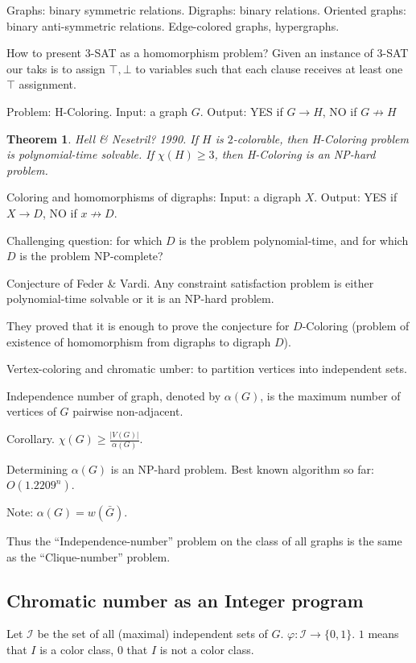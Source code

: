 \documentclass[12pt,a4paper]{article}
\newtheorem{theorem}{Theorem}
\begin{document}
Graphs: binary symmetric relations.
Digraphs: binary relations.
Oriented graphs: binary anti-symmetric relations.
Edge-colored graphs, hypergraphs.

How to present \(3\)-SAT as a homomorphism problem?  Given an instance of
\(3\)-SAT our taks is to assign \(\top, \bot\) to variables such that each
clause receives at least one \(\top\) assignment.

Problem: H-Coloring.
Input: a graph \(G\).
Output: YES if \(G \to H\), NO if \(G \not\to H\)

\begin{theorem}
  Hell \& Nesetril? 1990.  If \(H\) is \(2\)-colorable, then H-Coloring problem
  is polynomial-time solvable.  If \(\chi(H) \geq 3\), then H-Coloring is an
  NP-hard problem.
\end{theorem}

Coloring and homomorphisms of digraphs:
Input: a digraph \(X\).
Output: YES if \(X \to D\), NO if \(x \not\to D\).

Challenging question: for which \(D\) is the problem polynomial-time, and for
which \(D\) is the problem NP-complete?

Conjecture of Feder \& Vardi. Any constraint satisfaction problem is either
polynomial-time solvable or it is an NP-hard problem.

They proved that it is enough to prove the conjecture for \(D\)-Coloring
(problem of existence of homomorphism from digraphs to digraph \(D\)).

Vertex-coloring and chromatic umber: to partition vertices into independent
sets.

Independence number of graph, denoted by \(\alpha(G)\), is the maximum number of
vertices of \(G\) pairwise non-adjacent.

Corollary. \(\chi(G) \geq \frac{|V(G)|}{\alpha(G)}\).

Determining \(\alpha(G)\) is an NP-hard problem.  Best known algorithm so far:
\(O(1.2209^n)\).

Note: \(\alpha(G) = w(\bar{G})\).

Thus the \enquote{Independence-number} problem on the class of all graphs is the same as
the \enquote{Clique-number} problem.

\subsection{Chromatic number as an Integer program}

Let \(\mathcal{I}\) be the set of all (maximal) independent sets of \(G\).
\(\varphi: \mathcal{I} \to \{0, 1\}\). \(1\) means that \(I\) is a color class,
\(0\) that \(I\) is not a color class.
\end{document}
